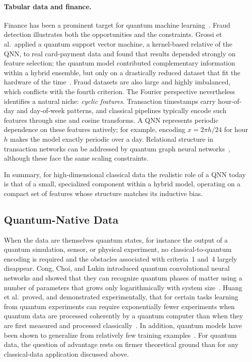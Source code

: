 \documentclass[12pt]{article}
\numberwithin{equation}{section}  %
\begin{document}
\paragraph{Tabular data and finance.} Finance has been a prominent target for quantum machine learning~\cite{herman2023quantum}. Fraud detection illustrates both the opportunities and the constraints. Grossi et al.\ applied a quantum support vector machine, a kernel-based relative of the QNN, to real card-payment data and found that results depended strongly on feature selection; the quantum model contributed complementary information within a hybrid ensemble, but only on a drastically reduced dataset that fit the hardware of the time~\cite{grossi2022mixed}. Fraud datasets are also large and highly imbalanced, which conflicts with the fourth criterion. The Fourier perspective nevertheless identifies a natural niche: \emph{cyclic features}. Transaction timestamps carry hour-of-day and day-of-week patterns, and classical pipelines typically encode such features through sine and cosine transforms. A QNN represents periodic dependence on these features natively; for example, encoding $x = 2\pi h/24$ for hour $h$ makes the model exactly periodic over a day. Relational structure in transaction networks can be addressed by quantum graph neural networks~\cite{verdon2019quantum}, although these face the same scaling constraints.

In summary, for high-dimensional classical data the realistic role of a QNN today is that of a small, specialized component within a hybrid model, operating on a compact set of features whose structure matches its inductive bias.

\subsection{Quantum-Native Data}
\label{sec:app_quantum_data}

When the data are themselves quantum states, for instance the output of a quantum simulation, sensor, or physical experiment, no classical-to-quantum encoding is required and the obstacles associated with criteria~1 and~4 largely disappear. Cong, Choi, and Lukin introduced quantum convolutional neural networks and showed that they can recognize quantum phases of matter using a number of parameters that grows only logarithmically with system size~\cite{cong2019quantum}. Huang et al.\ proved, and demonstrated experimentally, that for certain tasks learning from quantum experiments can require exponentially fewer experiments when quantum data are processed coherently by a quantum computer than when they are first measured and processed classically~\cite{huang2022quantum}. In addition, quantum models have been shown to generalize from relatively few training examples~\cite{caro2022generalization}. For quantum data, the question of advantage rests on firmer theoretical ground than for any classical-data application discussed above.
\end{document}
